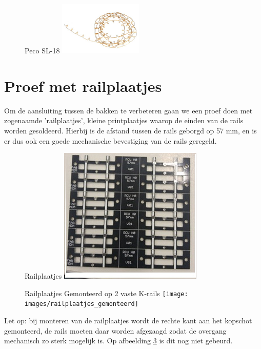 \documentclass[12pt,a4paper]{report}
\begin{document}
\begin{figure}[!ht]
  \captionbox
  {Peco SL-18\label{pecosl18}}
  {\includegraphics[scale=1.0]{images/rcu_peco_sl18}}
\end{figure}

\section{Proef met railplaatjes}

Om de aansluiting tussen de bakken te verbeteren gaan we een proef doen met zogenaamde 'railplaatjes', kleine printplaatjes waarop de einden van de rails worden gesoldeerd. Hierbij is de afstand tussen de rails geborgd op 57 mm, en is er dus ook een goede mechanische bevestiging van de rails geregeld.

\begin{figure}[!ht]
  \captionbox
  {Railplaatjes\label{railplaatjes}}
  {\includegraphics[scale=0.6]{images/railplaatjes}}
\end{figure}

\begin{figure}[!ht]
  \captionbox
  {Railplaatjes Gemonteerd op 2 vaste K-rails\label{railplaatjes_gemonteerd}}
  {\texttt{[image: images/railplaatjes\_gemonteerd]}}
\end{figure}

Let op: bij monteren van de railplaatjes wordt de rechte kant aan het kopschot gemonteerd, de rails moeten daar worden afgezaagd zodat de overgang mechanisch zo sterk mogelijk is. Op afbeelding \ref{railplaatjes_gemonteerd} is dit nog niet gebeurd.
\end{document}
